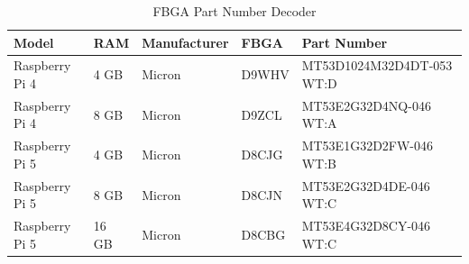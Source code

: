         \begin{table}[h!]
            \centering
            \caption{FBGA Part Number Decoder}
            \label{tab:fbga-part-number-decoder}
            \begin{tabular}{lllll}
                \hline
                \textbf{Model} & \textbf{RAM} & \textbf{Manufacturer} & \textbf{FBGA} & \textbf{Part Number}\\
                \hline
                Raspberry Pi 4 & 4 GB & Micron & D9WHV & MT53D1024M32D4DT-053 WT:D \\
                Raspberry Pi 4 & 8 GB & Micron & D9ZCL & MT53E2G32D4NQ-046 WT:A \\
                Raspberry Pi 5 & 4 GB & Micron & D8CJG & MT53E1G32D2FW-046 WT:B \\
                Raspberry Pi 5 & 8 GB & Micron & D8CJN & MT53E2G32D4DE-046 WT:C \\
                Raspberry Pi 5 & 16 GB & Micron & D8CBG & MT53E4G32D8CY-046 WT:C \\
                \hline
            \end{tabular}
        \end{table}
        
